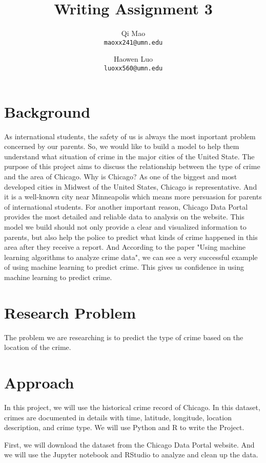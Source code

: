 \documentclass{article}
\begin{document}
\title{Writing Assignment 3}
\author{Qi Mao\\
  \texttt{maoxx241@umn.edu}
  \and
  Haowen Luo\\
  \texttt{luoxx560@umn.edu}
  }
\maketitle

\section{Background}
As international students, the safety of us is always the most inportant problem concerned by our parents. So, we would like to build a model to help them understand what situation of crime in the major cities of the United State. The purpose of this project aims to discuss the relationship between the type of crime and the area of Chicago. Why is Chicago? As one of the biggest and most developed cities in Midwest of the United States, Chicago is representative. And it is a well-known city near Minneapolis which means more persuasion for parents of international students. For another important reason, Chicago Data Portal provides the most detailed and reliable data to analysis on the website. This model we build should not only provide a clear and visualized information to parents, but also help the police to predict what kinds of crime happened in this area after they receive a report.
And According to the paper "Using machine learning algorithms to analyze crime data", we can see a very successful example of using machine learning to predict crime.\cite{mcclendon2015using}
This gives us confidence in using machine learning to predict crime.
\section{Research Problem}
The problem we are researching is to predict 
the type of crime based on the location of the crime.

\section{Approach}
In this project, we will use the historical crime record of Chicago. In this dataset, crimes are documented in details with time, latitude, longitude, location description, and crime type. 
We will use Python and R to write the Project.

First, we will download the dataset from the Chicago Data Portal website. And we will use the Jupyter notebook and RStudio to analyze and clean up the data.
\end{document}
